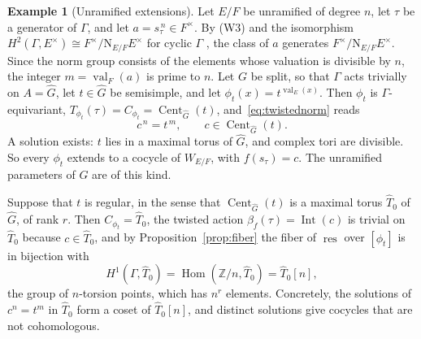 \documentclass[12pt,letterpaper]{article}
\numberwithin{equation}{section}
\theoremstyle{plain}
\theoremstyle{definition}
\newtheorem{example}[theorem]{Example}
\newcommand{\Z}{\mathbb{Z}}
\newcommand{\Gh}{\widehat{G}}
\newcommand{\Th}{\widehat{T}}
\DeclareMathOperator{\Hom}{Hom}
\DeclareMathOperator{\Int}{Int}
\DeclareMathOperator{\Cent}{Cent}
\DeclareMathOperator{\val}{val}
\DeclareMathOperator{\res}{res}
\newcommand{\Nm}{\mathrm{N}_{E/F}}
\begin{document}
\begin{example}[Unramified extensions]\label{ex:unramified}
Let $E/F$ be unramified of degree $n$, let $\tau$ be a generator of
$\Gamma$, and let $a=s_\tau^{\,n}\in F^\times$. By (W3) and the
isomorphism $H^2(\Gamma,E^\times)\cong F^\times/\Nm E^\times$ for cyclic
$\Gamma$ \cite[Ch.~VIII, \S4]{Se79}, the class of $a$ generates
$F^\times/\Nm E^\times$. Since the norm group consists of the
elements whose valuation is divisible by $n$, the integer $m=\val_F(a)$ is
prime to $n$. Let $G$ be split, so that $\Gamma$ acts trivially on
$A=\Gh$, let $t\in\Gh$ be semisimple, and let
$\phi_t(x)=t^{\val_E(x)}$. Then $\phi_t$ is $\Gamma$-equivariant,
$T_{\phi_t}(\tau)=C_{\phi_t}=\Cent_{\Gh}(t)$, and~\eqref{eq:twistednorm}
reads
\[
c^{\,n}=t^{\,m},\qquad c\in\Cent_{\Gh}(t).
\]
A solution exists: $t$ lies in a maximal torus of $\Gh$, and complex tori
are divisible. So every $\phi_t$ extends to a cocycle of $W_{E/F}$, with
$f(s_\tau)=c$. The unramified parameters of $G$ are of this kind.

Suppose that $t$ is regular, in the sense that $\Cent_{\Gh}(t)$ is a
maximal torus $\Th_0$ of $\Gh$, of rank $r$. Then $C_{\phi_t}=\Th_0$, the
twisted action $\beta_f(\tau)=\Int(c)$ is trivial on $\Th_0$ because
$c\in\Th_0$, and by Proposition~\ref{prop:fiber} the fiber of $\res$ over
$[\phi_t]$ is in bijection with
\[
H^1(\Gamma,\Th_0)=\Hom(\Z/n,\Th_0)=\Th_0[n],
\]
the group of $n$-torsion points, which has $n^r$ elements. Concretely,
the solutions of $c^n=t^m$ in $\Th_0$ form a coset of $\Th_0[n]$, and
distinct solutions give cocycles that are not cohomologous.
\end{example}
\end{document}
